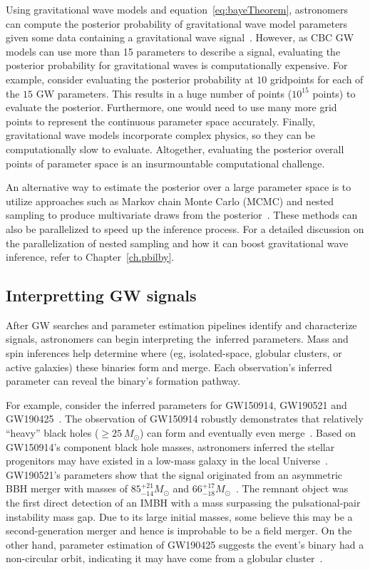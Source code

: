 Using gravitational wave models and equation~\ref{eq:bayeTheorem}, astronomers can compute the posterior probability of gravitational wave model parameters given some data containing a gravitational wave signal~\cite{abbott2018prospects}.
However, as CBC GW models can use more than 15 parameters to describe a signal, evaluating the posterior probability for gravitational waves is computationally expensive. 
For example, consider evaluating the posterior probability at $10$ gridpoints for each of the $15$ GW parameters.
This results in a huge number of points ($10^{15}$ points) to evaluate the posterior.
Furthermore, one would need to use many more grid points to represent the continuous parameter space accurately.
Finally, gravitational wave models incorporate complex physics, so they can be computationally slow to evaluate. 
Altogether, evaluating the posterior overall points of parameter space is an insurmountable computational challenge.

An alternative way to estimate the posterior over a large parameter space is to utilize approaches such as Markov chain Monte Carlo (MCMC) and nested sampling to produce multivariate draws from the posterior~\cite{bilby_paper, bilby_gwtc, dynesty_paper, skilling2004, skilling2006}. 
These methods can also be parallelized to speed up the inference process. 
For a detailed discussion on the parallelization of nested sampling and how it can boost gravitational wave inference, refer to Chapter~\ref{ch.pbilby}. 


\subsection{Interpretting GW signals}

After GW searches and parameter estimation pipelines identify and characterize signals, astronomers can begin interpreting the inferred parameters.
Mass and spin inferences help determine where (eg, isolated-space, globular clusters, or active galaxies) these binaries form and merge.
Each observation's inferred parameter can reveal the binary's formation pathway.

For example, consider the inferred parameters for GW150914, GW190521 and GW190425~\cite{abbott2016observation, gw190521,gw190425}. 
The observation of GW150914 robustly demonstrates that relatively ``heavy'' black holes ($\geq25\ M_{\odot}$) can form and eventually even merge~\cite{gw150914_asto_implications}.
Based on GW150914's component black hole masses, astronomers inferred the stellar progenitors may have existed in a low-mass galaxy in the local Universe~\cite{gw150914_asto_implications}. 
GW190521's parameters show that the signal originated from an asymmetric BBH merger with masses of $85^{+21}_{-14}M_{\odot}$ and $66^{+17}_{-18}M_{\odot}$~\cite{gw190521}.
The remnant object was the first direct detection of an IMBH with a mass surpassing the pulsational-pair instability mass gap.
Due to its large initial masses, some believe this may be a second-generation merger and hence is improbable to be a field merger. 
On the other hand,  parameter estimation of GW190425 suggests the event's binary had a non-circular orbit, indicating it may have come from a globular cluster~\cite{Romero-Shaw:2020:MNRAS}.

